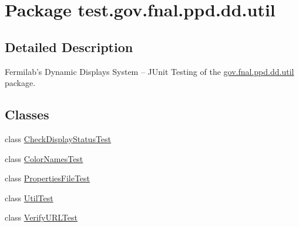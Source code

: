 \hypertarget{namespacetest_1_1gov_1_1fnal_1_1ppd_1_1dd_1_1util}{\section{Package test.\-gov.\-fnal.\-ppd.\-dd.\-util}
\label{namespacetest_1_1gov_1_1fnal_1_1ppd_1_1dd_1_1util}
}


\subsection{Detailed Description}
Fermilab's Dynamic Displays System -- J\-Unit Testing of the \hyperlink{namespacetest_1_1gov_1_1fnal_1_1ppd_1_1dd_1_1util}{gov.\-fnal.\-ppd.\-dd.\-util} package.\subsection*{Classes}
\begin{DoxyCompactItemize}
\item 
class \hyperlink{classtest_1_1gov_1_1fnal_1_1ppd_1_1dd_1_1util_1_1CheckDisplayStatusTest}{Check\-Display\-Status\-Test}
\item 
class \hyperlink{classtest_1_1gov_1_1fnal_1_1ppd_1_1dd_1_1util_1_1ColorNamesTest}{Color\-Names\-Test}
\item 
class \hyperlink{classtest_1_1gov_1_1fnal_1_1ppd_1_1dd_1_1util_1_1PropertiesFileTest}{Properties\-File\-Test}
\item 
class \hyperlink{classtest_1_1gov_1_1fnal_1_1ppd_1_1dd_1_1util_1_1UtilTest}{Util\-Test}
\item 
class \hyperlink{classtest_1_1gov_1_1fnal_1_1ppd_1_1dd_1_1util_1_1VerifyURLTest}{Verify\-U\-R\-L\-Test}
\end{DoxyCompactItemize}
